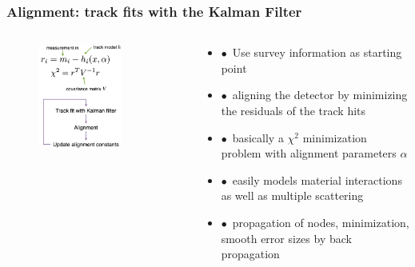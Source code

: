 \documentclass[aspectratio=1610, 12pt]{beamer}
\begin{document}
\begin{frame}\frametitle{Alignment: track fits with the Kalman Filter}
  \begin{columns}
    \begin{column}[c]{0.4\textwidth}
      \begin{figure}
        \centering
        \includegraphics[width=0.72\textwidth]{logos/kalman.png}
      \end{figure}
    \end{column}
    \begin{column}[c]{0.55\textwidth}
      \begin{itemize}
        \item $\bullet$\, Use survey information as starting point
        \item $\bullet$\, aligning the detector by minimizing the residuals of the track hits
        \item $\bullet$\, basically a $\chi^2$ minimization problem with alignment parameters $\alpha$
        \item $\bullet$\, easily models material interactions as well as multiple scattering
        \item $\bullet$\, propagation of nodes, minimization, smooth error sizes by back propagation
      \end{itemize}
    \end{column}
  \end{columns}
\end{frame}
\end{document}
